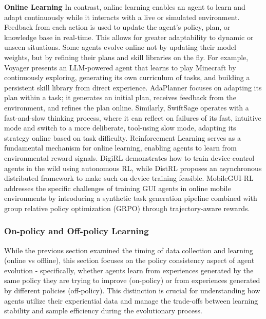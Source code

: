 \textbf{Online Learning}
In contrast, online learning enables an agent to learn and adapt continuously while it interacts with a live or simulated environment. Feedback from each action is used to update the agent’s policy, plan, or knowledge base in real-time. This allows for greater adaptability to dynamic or unseen situations.
Some agents evolve online not by updating their model weights, but by refining their plans and skill libraries on the fly. For example, Voyager\citep{wang2023voyager} presents an LLM-powered agent that learns to play Minecraft by continuously exploring, generating its own curriculum of tasks, and building a persistent skill library from direct experience.
AdaPlanner\citep{sun2023adaplanner} focuses on adapting its plan within a task; it generates an initial plan, receives feedback from the environment, and refines the plan online. Similarly, SwiftSage\citep{lin2023swiftsage} operates with a fast-and-slow thinking process, where it can reflect on failures of its fast, intuitive mode and switch to a more deliberate, tool-using slow mode, adapting its strategy online based on task difficulty.
Reinforcement Learning serves as a fundamental mechanism for online learning, enabling agents to learn from environmental reward signals. DigiRL\citep{bai2024digirl} demonstrates how to train device-control agents in the wild using autonomous RL, while DistRL\citep{wang2024distrl} proposes an asynchronous distributed framework to make such on-device training feasible. MobileGUI-RL\citep{shi2025mobileguirladvancingmobilegui} addresses the specific challenges of training GUI agents in online mobile environments by introducing a synthetic task generation pipeline combined with group relative policy optimization (GRPO) through trajectory-aware rewards.

\subsubsection{On-policy and Off-policy Learning}

While the previous section examined the timing of data collection and learning (online vs offline), this section focuses on the policy consistency aspect of agent evolution - specifically, whether agents learn from experiences generated by the same policy they are trying to improve (on-policy) or from experiences generated by different policies (off-policy). This distinction is crucial for understanding how agents utilize their experiential data and manage the trade-offs between learning stability and sample efficiency during the evolutionary process.

